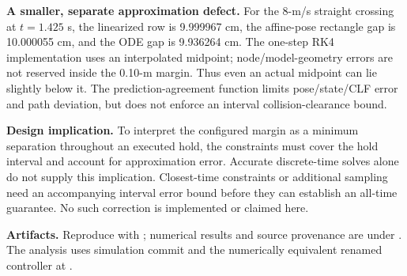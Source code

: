 \documentclass[10pt]{article}
\begin{document}
\textbf{A smaller, separate approximation defect.}
For the 8-m/s straight crossing at $t=1.425$ s, the linearized row is
9.999967 cm, the affine-pose rectangle gap is 10.000055 cm, and the ODE gap is
9.936264 cm. The one-step RK4 implementation uses an interpolated midpoint;
node/model-geometry errors are not reserved inside the 0.10-m margin. Thus even
an actual midpoint can lie slightly below it. The prediction-agreement function
limits pose/state/CLF error and path deviation, but does not enforce an interval
collision-clearance bound.

\textbf{Design implication.} To interpret the configured margin as a minimum
separation throughout an executed hold, the constraints must cover the hold
interval and account for approximation error. Accurate discrete-time solves
alone do not supply this implication. Closest-time constraints or additional
sampling need an accompanying interval error bound before they can establish
an all-time guarantee. No such correction is implemented or claimed here.

\textbf{Artifacts.} Reproduce with
; numerical results and source
provenance are under .
The analysis uses simulation commit
 and the numerically equivalent
renamed controller at .
\end{document}
